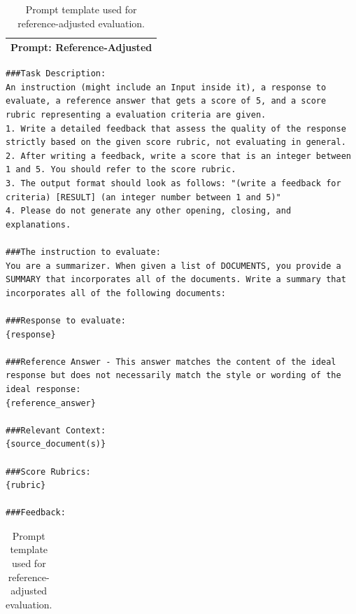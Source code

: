 \begin{table}[h]
\centering
\footnotesize
\begin{tabular}{p{}} 
\footnotesize
\toprule
\textbf{Prompt: Reference-Adjusted} \\
\midrule
\end{tabular}
\begin{lstlisting}[style=promptstyle]
###Task Description:
An instruction (might include an Input inside it), a response to evaluate, a reference answer that gets a score of 5, and a score rubric representing a evaluation criteria are given.
1. Write a detailed feedback that assess the quality of the response strictly based on the given score rubric, not evaluating in general.
2. After writing a feedback, write a score that is an integer between 1 and 5. You should refer to the score rubric.
3. The output format should look as follows: "(write a feedback for criteria) [RESULT] (an integer number between 1 and 5)"
4. Please do not generate any other opening, closing, and explanations.

###The instruction to evaluate:
You are a summarizer. When given a list of DOCUMENTS, you provide a SUMMARY that incorporates all of the documents. Write a summary that incorporates all of the following documents:

###Response to evaluate:
{response}

###Reference Answer - This answer matches the content of the ideal response but does not necessarily match the style or wording of the ideal response:
{reference_answer}

###Relevant Context:
{source_document(s)}

###Score Rubrics:
{rubric}

###Feedback: 
\end{lstlisting}
\begin{tabular}{p{\columnwidth}}
\bottomrule
\end{tabular}
\caption{Prompt template used for reference-adjusted evaluation.}
\label{tab:prompt-reference-adjusted}
\end{table}

